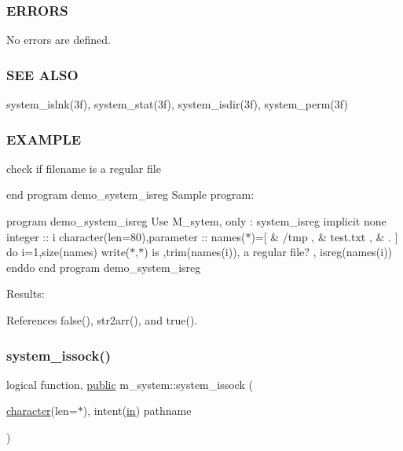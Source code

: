 \subsubsection*{E\+R\+R\+O\+RS}

No errors are defined.

\subsubsection*{S\+EE A\+L\+SO}

system\+\_\+islnk(3f), system\+\_\+stat(3f), system\+\_\+isdir(3f), system\+\_\+perm(3f)

\subsubsection*{E\+X\+A\+M\+P\+LE}

check if filename is a regular file

end program demo\+\_\+system\+\_\+isreg Sample program\+:

program demo\+\_\+system\+\_\+isreg Use M\+\_\+sytem, only \+: system\+\_\+isreg implicit none integer \+:\+: i character(len=80),parameter \+:\+: names($\ast$)=\mbox{[} \& \textquotesingle{}/tmp \textquotesingle{}, \& \textquotesingle{}test.\+txt \textquotesingle{}, \& \textquotesingle{}. \textquotesingle{}\mbox{]} do i=1,size(names) write($\ast$,$\ast$)\textquotesingle{} is \textquotesingle{},trim(names(i)),\textquotesingle{} a regular file? \textquotesingle{}, isreg(names(i)) enddo end program demo\+\_\+system\+\_\+isreg

Results\+: 

References false(), str2arr(), and true().

\mbox{\label{namespacem__system_af6eb5074fe74552bc7a5e7d00f459087}} 
\subsubsection{\texorpdfstring{system\+\_\+issock()}{system\_issock()}}
{\footnotesize\ttfamily logical function, \hyperlink{M__stopwatch_83_8txt_a2f74811300c361e53b430611a7d1769f}{public} m\+\_\+system\+::system\+\_\+issock (\begin{DoxyParamCaption}\item[{\hyperlink{option__stopwatch_83_8txt_abd4b21fbbd175834027b5224bfe97e66}{character}(len=$\ast$), intent(\hyperlink{M__journal_83_8txt_afce72651d1eed785a2132bee863b2f38}{in})}]{pathname }\end{DoxyParamCaption})}



